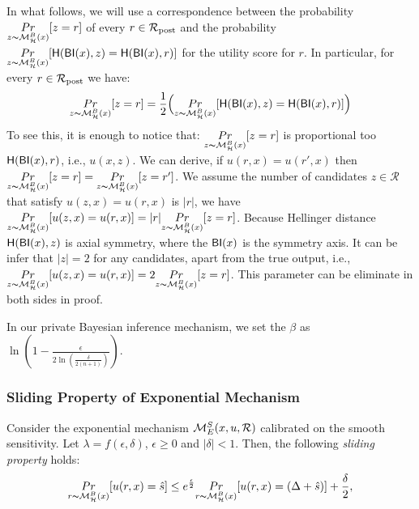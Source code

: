 \documentclass[sigconf, anonymous]{acmart}
\begin{document}
In what follows, we will use a correspondence between the probability
 $\underset{z \thicksim \mathcal{M}^{B}_{\mathcal{H}}(x)}{Pr}[z = r]$ of every
 $r\in\mathcal{R}_{\textup{post}}$ and the probability 
 $\underset{z \thicksim \mathcal{M}^{B}_{\mathcal{H}}(x)}{Pr}[\mathsf{H}(\mathsf{BI}(x),z) =
 \mathsf{H}(\mathsf{BI}(x),r)]$ for the utility score for $r$. In particular, for every
 $r\in\mathcal{R}_{\textup{post}}$ we have:
$$
\underset{z \thicksim \mathcal{M}^{B}_{\mathcal{H}}(x)}{Pr}[z = r]=
\frac{1}{2}\Big (\underset{z \thicksim \mathcal{M}^{B}_{\mathcal{H}}(x)}{Pr}[\mathsf{H}(\mathsf{BI}(x),z) =
 \mathsf{H}(\mathsf{BI}(x),r)]\Big )
$$
To see this, it is enough to notice that: $\underset{z \thicksim \mathcal{M}^{B}_{\mathcal{H}}(x)}{Pr}[z = r]$ is proportional too $\mathsf{H}(\mathsf{BI}(x),r)$, i.e., $u(x,z)$. We can derive, if $u(r,x) = u(r',x)$ then $\underset{z \thicksim \mathcal{M}^{B}_{\mathcal{H}}(x)}{Pr}[z = r] = \underset{z \thicksim \mathcal{M}^{B}_{\mathcal{H}}(x)}{Pr}[z = r']$. We assume the number of candidates $z \in \mathcal{R}$ that satisfy $u(z,x) = u(r,x)$ is $|r|$, we have  $\underset{z \thicksim \mathcal{M}^{B}_{\mathcal{H}}(x)}{Pr}[u(z,x) = u(r,x)] = |r| \underset{z \thicksim \mathcal{M}^{B}_{\mathcal{H}}(x)}{Pr}[z = r]$. Because Hellinger distance  $\mathsf{H}(\mathsf{BI}(x),z)$ is axial symmetry, where the $\mathsf{BI}(x)$ is the symmetry axis. It can be infer that $|z| = 2$ for any candidates, apart from the true output, i.e., $\underset{z \thicksim \mathcal{M}^{B}_{\mathcal{H}}(x)}{Pr}[u(z,x) = u(r,x)] = 2 \underset{z \thicksim \mathcal{M}^{B}_{\mathcal{H}}(x)}{Pr}[z = r]$. This parameter can be eliminate in both sides in proof.

In our private Bayesian inference mechanism, we set the $\beta$ as $\ln(1 - \frac{\epsilon}{2 \ln (\frac{\delta}{2 (n + 1)})})$. 


\subsubsection{Sliding Property of Exponential Mechanism}
\begin{lem}
Consider the exponential mechanism  $\mathcal{M}_E^S(x,u,\mathcal{R})$
calibrated on the smooth sensitivity. Let $\lambda = f(\epsilon,
\delta)$, $\epsilon\geq 0$ and $|\delta| < 1$. Then, the following \emph{sliding property} holds:
\begin{equation*}
\underset{r \thicksim \mathcal{M}^{B}_{\mathcal{H}}(x)}{Pr}[u(r,x) = \hat{s}]
\leq
e^{\frac{\epsilon}{2}} \underset{r \thicksim \mathcal{M}^{B}_{\mathcal{H}}(x)}{Pr}[u(r,x) = (\Delta + \hat{s})] + \frac{\delta}{2},
\end{equation*}

\end{lem}
\end{document}
